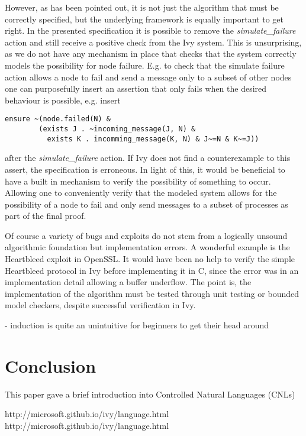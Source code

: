 \documentclass[fleqn]{article}
\begin{document}
However, as has been pointed out, it is not just the algorithm that must be correctly specified, but the underlying framework is equally important to get right. In the presented specification it is possible to remove the \textit{simulate\_failure} action and still receive a positive check from the Ivy system. This is unsurprising, as we do not have any mechanism in place that checks that the system correctly models the possibility for node failure. E.g. to check that the simulate failure action allows a node to fail and send a message only to a subset of other nodes one can purposefully insert an assertion that only fails when the desired behaviour is possible, e.g. insert
\begin{mdframed}[backgroundcolor=light-gray, roundcorner=10pt,leftmargin=1, rightmargin=1, innerleftmargin=5, innertopmargin=15,innerbottommargin=15, outerlinewidth=1, linecolor=light-gray]
\begin{lstlisting}
ensure ~(node.failed(N) &
        (exists J . ~incoming_message(J, N) &
          exists K . incomming_message(K, N) & J~=N & K~=J))
\end{lstlisting}
\end{mdframed}
after the \textit{simulate\_failure} action. If Ivy does not find a counterexample to this assert, the specification is erroneous.  In light of this, it would be beneficial to have a built in mechanism to verify the possibility of something to occur. Allowing one to conveniently verify that the modeled system allows for the possibility of a node to fail and only send messages to a subset of processes as part of the final proof.




Of course a variety of bugs and exploits do not stem from a logically unsound algorithmic foundation but implementation errors. A wonderful example is the Heartbleed exploit in OpenSSL. It would have been no help to verify the simple Heartbleed protocol in Ivy before implementing it in C, since the error was in an implementation detail allowing a buffer underflow. The point is, the implementation of the algorithm must be tested through unit testing or bounded model checkers, despite successful verification in Ivy.


- induction is quite an unintuitive for beginners to get their head around

\section{Conclusion}
This paper gave a brief introduction into Controlled Natural Languages (CNLs)

\begin{thebibliography}{99}

     http://microsoft.github.io/ivy/language.html
     http://microsoft.github.io/ivy/language.html
\end{thebibliography}

\end{document}
